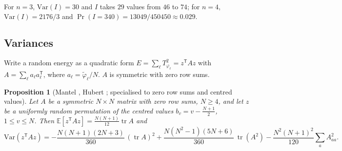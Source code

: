 \documentclass[11pt,a4paper]{article}
\theoremstyle{plain}
\newtheorem{proposition}[theorem]{Proposition}
\theoremstyle{definition}
\theoremstyle{remark}
\newcommand{\Var}{\mathrm{Var}}
\newcommand{\E}{\mathbb{E}}
\newcommand{\tr}{\operatorname{tr}}
\begin{document}
For $n=3$, $\Var(I)=30$ and $I$ takes $29$ values from $46$ to $74$; for $n=4$, $\Var(I)=2176/3$ and $\Pr(I=340)=13049/450450\approx0.029$.

\subsection{Variances}
\label{sec:random_var}

Write a random energy as a quadratic form $E=\sum_\ell T_{\varphi_\ell}^2=z^{\mathsf T}Az$ with $A=\sum_\ell a_\ell a_\ell^{\mathsf T}$, where $a_\ell=\tilde\varphi_\ell/N$.
$A$ is symmetric with zero row sums.

\begin{proposition}[{Mantel \cite{mantel1967}, Hubert \cite{hubert1987assignment}; specialised to zero row sums and centred values}]
\label{prop:var_identity}
Let $A$ be a symmetric $N\times N$ matrix with zero row sums, $N\ge4$, and let $z$ be a uniformly random permutation of the centred values $b_v=v-\frac{N+1}2$, $1\le v\le N$.  Then $\E[z^{\mathsf T}Az]=\frac{N(N+1)}{12}\tr A$ and
\begin{equation}
\Var(z^{\mathsf T}Az)=-\frac{N(N+1)(2N+3)}{360}\,(\tr A)^2+\frac{N(N^2-1)(5N+6)}{360}\,\tr(A^2)-\frac{N^2(N+1)^2}{120}\sum_aA_{aa}^2 .
\label{eq:var_identity}
\end{equation}
\end{proposition}
\end{document}
